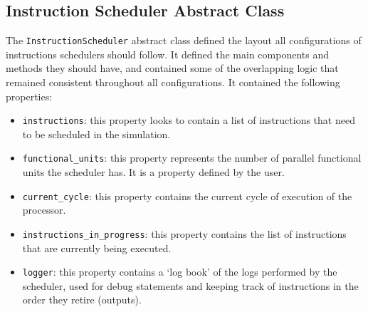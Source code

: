 \documentclass{article}
\begin{document}
\subsection{Instruction Scheduler Abstract Class}
The \lstinline|InstructionScheduler| abstract class defined the layout all configurations of instructions schedulers should follow. It defined the main components and methods they should have, and contained some of the overlapping logic that remained consistent throughout all configurations. It contained the following properties:
\begin{itemize}
    \item \lstinline|instructions|: this property looks to contain a list of instructions that need to be scheduled in the simulation.
    \item \lstinline|functional_units|: this property represents the number of parallel functional units the scheduler has. It is a property defined by the user. 
    \item \lstinline|current_cycle|: this property contains the current cycle of execution of the processor.
    \item \lstinline|instructions_in_progress|: this property contains the list of instructions that are currently being executed. 
    \item \lstinline|logger|: this property contains a `log book' of the logs performed by the scheduler, used for debug statements and keeping track of instructions in the order they retire (outputs).
\end{itemize}
\end{document}

